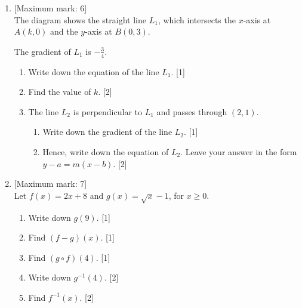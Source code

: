 \documentclass[12pt, twoside]{article}
\begin{document}
\begin{enumerate}
    \item {[Maximum mark: 6]} \\[0.3cm]
    The diagram shows the straight line $L_1$, which intersects the $x$-axis at $A(k, 0)$ and the $y$-axis at $B(0,3)$.
        \begin{center}
        \end{center}
        The gradient of $L_1$ is $-\frac{3}{4}$.
        \begin{enumerate}%
            \item Write down the equation of the line $L_1$. \hfill [1]
            \item Find the value of $k$. \hfill [2]
            \item The line $L_2$ is perpendicular to $L_1$ and passes through $(2,1)$.
                \begin{enumerate}
                    \item Write down the gradient of the line $L_2$. \hfill [1]
                    \item Hence, write down the equation of $L_2$. Leave your answer in the form \\ $y-a=m(x-b)$. \hfill [2]
                \end{enumerate}
        \end{enumerate}

\newpage 
    \item {[Maximum mark: 7]} \\[0.3cm]
    Let $f(x)=2x+8$ and $g(x)=\sqrt{x}-1$, for $x \geq 0$.
        \begin{enumerate}
            \item Write down $g(9)$. \hfill [1]
            \item Find $(f - g)(x)$. \hfill [1]
            \item Find $(g \circ f)(4)$. \hfill [1]
            \item Write down $g^{-1}(4)$. \hfill [2]
            \item Find $f^{-1}(x)$. \hfill [2]
        \end{enumerate}
        \begin{tikzpicture}


\end{tikzpicture}
\end{enumerate}
\end{document}
